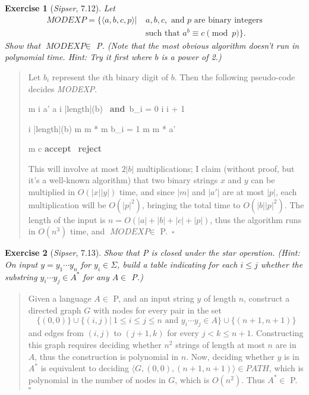\documentclass{article}
\theoremstyle{break}			%
\newtheorem{exercise}{Exercise}
\theoremstyle{plain}
\newenvironment{answer}{\begin{quotation}\noindent}{\end{quotation}}
\newcommand{\sipser}{\textit{Sipser}}
\newcommand{\encoding}[1]{\ensuremath{\langle#1\rangle}}
\renewcommand{\qed}{~\ensuremath{\square}}
\newcommand{\setname}[1]{\textit{#1}}
\renewcommand{\AND}{\ \keyword{and}\ }
\newcommand{\ENDWHILE}{\untab\addtocounter{programline}{-1}}
\newcommand{\ENDIF}{\untab\untab\addtocounter{programline}{-1}}
\newcommand{\ACCEPT}{\keyword{accept}\ }
\newcommand{\REJECT}{\keyword{reject}\ }
\renewcommand{\keyword}[1]{\textbf{#1}}
\begin{document}
\pagebreak
\begin{exercise}[\sipser, 7.12]\label{modexp}
Let
\begin{align*}
\setname{MODEXP}=\{\encoding{a,b,c,p}|~
&a,b,c,\text{ and $p$ are binary integers}\\
&\text{such that }a^b\equiv c\pmod{p}\}.
\end{align*}
Show that $\setname{MODEXP}\in$ P.  (Note that the most obvious algorithm
doesn't run in polynomial time.  Hint: Try it first where $b$ is a
power of 2.)
\end{exercise}
\begin{answer}
Let $b_i$ represent the $i$th binary digit of $b$.  Then the following
pseudo-code decides \setname{MODEXP}.
\begin{program}
m 
i 
a' \gets a 
\WHILE i \leq |length|(b) \AND b_i = 0
	i \gets i + 1
\ENDWHILE
\WHILE i \leq |length|(b)
	m \gets m * m 
	\IF b_i = 1
		\THEN m \gets m * a' 
	\ENDIF
\ENDWHILE
\IF m \equiv c 
	\THEN \ACCEPT
	\ELSE \REJECT
\ENDIF
\end{program}
This will involve at most $2|b|$ multiplications; I claim (without
proof, but it's a well-known algorithm) that two binary strings $x$
and $y$ can be multiplied in $O(|x||y|)$ time, and since $|m|$ and
$|a'|$ are at most $|p|$, each multiplication will be $O(|p|^2)$,
bringing the total time to $O(|b||p|^2)$.  The length of the input
is $n=O(|a|+|b|+|c|+|p|)$, thus the algorithm runs in $O(n^3)$ time,
and $\setname{MODEXP}\in$ P.\qed
\end{answer}

\begin{exercise}[\sipser, 7.13]
Show that P is closed under the star operation.  (Hint: On input
$y=y_1\cdots y_n$ for $y_i\in\Sigma$, build a table indicating for
each $i\leq j$ whether the substring $y_i\cdots y_j\in A^*$ for any
$A\in$ P.)
\end{exercise}
\begin{answer}
Given a language $A\in$ P, and an input string $y$ of length $n$, construct a
directed graph $G$ with nodes for every pair in the set
\begin{displaymath}
\{(0,0)\} \cup 
\{(i,j)|~1\leq i\leq j\leq n \text{ and } y_i\cdots y_j\in A\} \cup
\{(n+1,n+1)\}
\end{displaymath}
and edges from $(i,j)$ to $(j+1,k)$ for every $j<k\leq n+1$.
Constructing this graph requires deciding whether $n^2$ strings of
length at most $n$ are in $A$, thus the construction is polynomial in
$n$.  Now, deciding whether $y$ is in $A^*$ is equivalent to deciding
$\encoding{G,(0,0),(n+1,n+1)}\in\setname{PATH}$, which is polynomial
in the number of nodes in $G$, which is $O(n^2)$.  Thus $A^*\in$
P.\qed
\end{answer}
\end{document}
